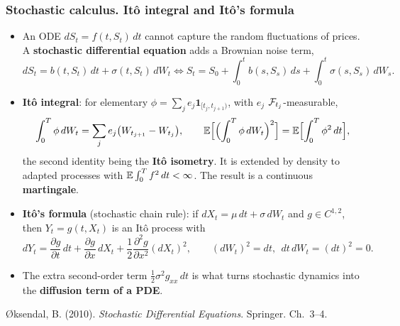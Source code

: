 
\begin{frame}
\frametitle{Stochastic calculus. It\^{o} integral and It\^{o}'s formula}
\begin{scriptsize}
\begin{itemize}
\item An ODE $dS_t = f(t, S_t)\, dt$ cannot capture the random fluctuations of prices.
A \textbf{stochastic differential equation} adds a Brownian noise term,
\begin{equation*}
    dS_t = b(t, S_t)\, dt + \sigma(t, S_t)\, dW_t
    \iff
    S_t = S_0 + \int_0^t b(s, S_s)\, ds + \int_0^t \sigma(s, S_s)\, dW_s .
\end{equation*}
\item \textbf{It\^{o} integral}: for elementary $\phi = \sum_j e_j \mathbf{1}_{[t_j, t_{j+1})}$, with $e_j$ $\mathcal{F}_{t_j}$-measurable,
\begin{equation*}
    \int_0^T \phi\, dW_t = \sum_j e_j \bigl( W_{t_{j+1}} - W_{t_j} \bigr),
    \qquad
    \mathbb{E}\Bigl[ \Bigl( \int_0^T \phi\, dW_t \Bigr)^2 \Bigr] = \mathbb{E}\Bigl[ \int_0^T \phi^2\, dt \Bigr],
\end{equation*}
the second identity being the \textbf{It\^{o} isometry}. It is
extended by density to adapted processes with $\mathbb{E} \int_0^T f^2\, dt < \infty$.
The result is a continuous \textbf{martingale}.
\item \textbf{It\^{o}'s formula} (stochastic chain rule): if $dX_t = \mu\, dt + \sigma\, dW_t$
and $g \in C^{1,2}$, then $Y_t = g(t, X_t)$ is an It\^{o} process with
\begin{equation*}
    dY_t = \frac{\partial g}{\partial t}\, dt
        + \frac{\partial g}{\partial x}\, dX_t
        + \frac{1}{2} \frac{\partial^2 g}{\partial x^2} (dX_t)^2,
    \qquad
    (dW_t)^2 = dt,\ \ dt\, dW_t = (dt)^2 = 0 .
\end{equation*}
\item The extra second-order term $\tfrac{1}{2} \sigma^2 g_{xx}\, dt$ is what turns
stochastic dynamics into the \textbf{diffusion term of a PDE}.
\end{itemize}
\smallskip
{\O}ksendal, B. (2010). \emph{Stochastic Differential Equations}. Springer. Ch.~3--4.
\end{scriptsize}
\end{frame}

